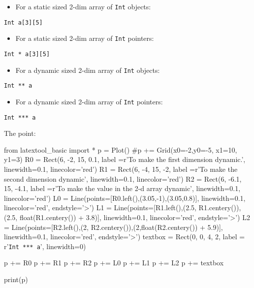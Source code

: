 \begin{itemize}
\item
  For a static sized 2-dim array of \texttt{Int} objects:
\end{itemize}
\begin{center} 
\texttt{Int a[3][5]}
\end{center}
\begin{itemize}
\item
  For a static sized 2-dim array of \texttt{Int} pointers:
\end{itemize}
\begin{center}
\texttt{Int * a[3][5]}
\end{center}
\begin{itemize}
\item
  For a dynamic sized 2-dim array of \texttt{Int} objects:
\end{itemize}
\begin{center}
\texttt{Int ** a}
\end{center}
\begin{itemize}
\item
  For a dynamic sized 2-dim array of \texttt{Int} pointers:
\end{itemize}
\begin{center}
\texttt{Int *** a}
\end{center}
The point:
\begin{python}
from latextool_basic import *
p = Plot()
#p += Grid(x0=-2,y0=-5, x1=10, y1=3)
R0 = Rect(6, -2, 15, 0.1, label =r'To make the first dimension dynamic.', linewidth=0.1, linecolor='red')
R1 = Rect(6, -4, 15, -2, label =r'To make the second dimension dynamic', linewidth=0.1, linecolor='red')
R2 = Rect(6, -6.1, 15, -4.1, label =r'To make the value in the 2-d array dynamic', linewidth=0.1, linecolor='red')
L0 = Line(points=[R0.left(),(3.05,-1),(3.05,0.8)], linewidth=0.1, linecolor='red', endstyle='>')
L1 = Line(points=[R1.left(),(2.5, R1.centery()),(2.5, float(R1.centery()) + 3.8)], linewidth=0.1, linecolor='red', endstyle='>')
L2 = Line(points=[R2.left(),(2, R2.centery()),(2,float(R2.centery()) + 5.9)], linewidth=0.1, linecolor='red', endstyle='>')
textbox = Rect(0, 0, 4, 2, label = r'\huge\texttt{Int *** a}', linewidth=0)

p += R0
p += R1
p += R2
p += L0
p += L1
p += L2
p += textbox

print(p)
\end{python}
